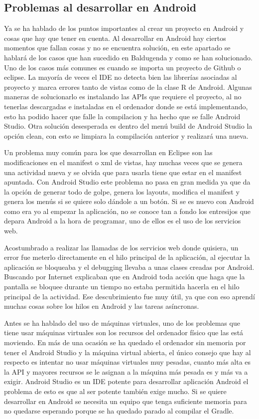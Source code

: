 \subsection{Problemas al desarrollar en Android}
\label{subsecc:Problemas al desarrollar en Android}

Ya se ha hablado de los puntos importantes al crear un proyecto en Android y cosas que hay que tener en cuenta.
Al desarrollar en Android hay ciertos momentos que fallan cosas y no se encuentra solución, en este apartado se hablará de los casos que han sucedido en Baldugenda y como se han solucionado.
Uno de los casos más comunes es cuando se importa un proyecto de Github o eclipse. La mayoría de veces el IDE no detecta bien las librerías asociadas al proyecto y marca errores tanto de vistas como de la clase R de Android.
Algunas maneras de solucionarlo es instalando las APIs que requiere el proyecto, al no tenerlas descargadas e instaladas en el ordenador donde se está implementando, esto ha podido hacer que falle la compilacion y ha hecho que se falle Android Studio.
Otra solución desesperada es dentro del menú build de Android Studio la opción clean, con esto se limpiara la compilación anterior y realizará una nueva.

Un problema muy común para los que desarrollan en Eclipse son las modificaciones en el manifest o xml de vistas, hay muchas veces que se genera una actividad nueva y se olvida que para usarla tiene que estar en el manifest apuntada.
Con Android Studio este problema no pasa en gran medida ya que da la opción de generar todo de golpe, genera los layouts, modifica el manifest y genera los menús si se quiere solo dándole a un botón.
Si se es nuevo con Android como era yo al empezar la aplicación, no se conoce tan a fondo los entresijos  que depara Android a la hora de programar, uno de ellos es el uso de los servicios web.

Acostumbrado a realizar las llamadas de los servicios web donde quisiera, un error fue meterlo directamente en el hilo principal de la aplicación, al ejecutar la aplicación se bloqueaba y el debugging llevaba a unas clases creadas por Android.
Buscando por Internet explicaban que en Android toda acción que haga que la pantalla se bloquee durante un tiempo no estaba permitida hacerla en el hilo principal de la actividad.
Ese descubrimiento fue muy útil, ya que con eso aprendí  muchas cosas sobre los hilos en Android y las tareas asíncronas.

Antes se ha hablado del uso de máquinas virtuales, uno de los problemas que tiene usar máquinas virtuales son los recursos del ordenador físico que las está moviendo. En más de una ocasión se ha quedado el ordenador sin memoria por tener el Android Studio y la máquina virtual abierta, el único consejo que hay al respecto es intentar no usar máquinas virtuales muy pesadas, cuanto más alta es la API y mayores recursos se le asignan a la máquina más pesada es y más va a exigir.
Android Studio es un IDE potente para desarrollar aplicación Android el problema de esto es que al ser potente también exige mucho. Si se quiere desarrollar en Android se necesita un equipo que tenga suficiente memoria para no quedarse esperando porque se ha quedado parado al compilar el Gradle.

